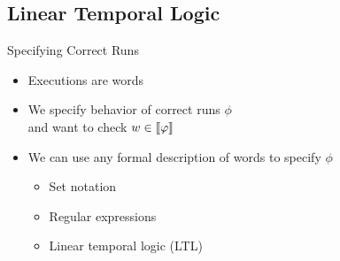 \subsection{Linear Temporal Logic}

\begin{Frame}{Specifying Correct Runs}
  \begin{itemize}
    \item Executions are words
    \item We specify behavior of correct runs $\phi$\\
      and want to check $w \in \llbracket \varphi \rrbracket$
    \item We can use any formal description of words to specify $\phi$
    \begin{itemize}
      \item Set notation
      \item Regular expressions
      \item \alert<2>{Linear temporal logic (LTL)}
    \end{itemize}
  \end{itemize}
\end{Frame}

